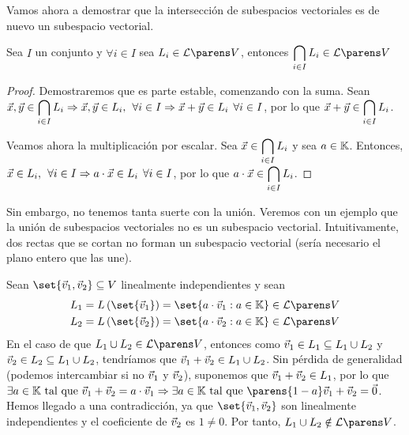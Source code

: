 \documentclass[../algebra_lineal.tex]{subfiles}
\begin{document}
Vamos ahora a demostrar que la intersección de subespacios vectoriales es de nuevo un subespacio vectorial.

\begin{proposition}
    Sea $I$ un conjunto y $\forall i \in I$ sea $L_i \in \subespaciosde{V}$, entonces $\displaystyle\bigcap_{i \in I}{L_i} \in \subespaciosde{V}$
\end{proposition}

\begin{proof}
    Demostraremos que es parte estable, comenzando con la suma.
    Sean $\vec{x}, \vec{y} \in \displaystyle\bigcap_{i \in I}L_i \Rightarrow \vec{x}, \vec{y} \in L_i, \hspace{1.5mm} \forall i \in I \Rightarrow \vec{x} + \vec{y} \in L_i \hspace{1.5mm} \forall i \in I$, por lo que $\vec{x} + \vec{y} \in \displaystyle\bigcap_{i \in I}L_i$.

    Veamos ahora la multiplicación por escalar. Sea $\vec{x} \in \displaystyle\bigcap_{i \in I}L_i$ y sea $a \in \mathbb{K}$. Entonces, $\vec{x} \in L_i, \hspace{1.5mm} \forall i \in I \Rightarrow a \cdot \vec{x} \in L_i \hspace{1.5mm} \forall i \in I$, por lo que $a \cdot \vec{x} \in \displaystyle\bigcap_{i \in I}L_i$.
\end{proof}

Sin embargo, no tenemos tanta suerte con la unión. Veremos con un ejemplo que la unión de subespacios vectoriales no es un subespacio vectorial. Intuitivamente, dos rectas que se cortan no forman un subespacio vectorial (sería necesario el plano entero que las une).

\begin{example}
    Sean $\set{\vv_1, \vv_2} \subseteq V$ linealmente independientes y sean
    \begin{align*}
        L_1 = \lspan{\set{\vv_1}} &= \set{a \cdot \vv_1 : a \in \K } \in \subespaciosde{V} \\
        L_2 = \lspan{\set{\vv_2}} &= \set{a \cdot \vv_2 : a \in \K } \in \subespaciosde{V}
    \end{align*}
    En el caso de que $L_1 \cup L_2 \in \subespaciosde{V}$, entonces como $\vec{v}_1 \in L_1 \subseteq L_1 \cup L_2$ y $\vec{v}_2 \in L_2 \subseteq L_1 \cup L_2$, tendríamos que $\vec{v}_1 + \vec{v}_2 \in L_1 \cup L_2$. Sin pérdida de generalidad (podemos intercambiar si no $\vec{v}_1$ y $\vec{v}_2$), suponemos que $\vec{v}_1 + \vec{v}_2 \in L_1$, por lo que $\exists a \in \K \st \vv_1 + \vv_2 = a \cdot \vv_1 \Rightarrow \exists a \in \K \st \parens{1-a}\vv_1 + \vv_2 = \zv$. Hemos llegado a una contradicción, ya que $\set{\vv_1, \vv_2}$ son linealmente independientes y el coeficiente de $\vec{v}_2$ es $1 \ne 0$. Por tanto, $L_1 \cup L_2 \notin \subespaciosde{V}$. 
\end{example}
\end{document}
